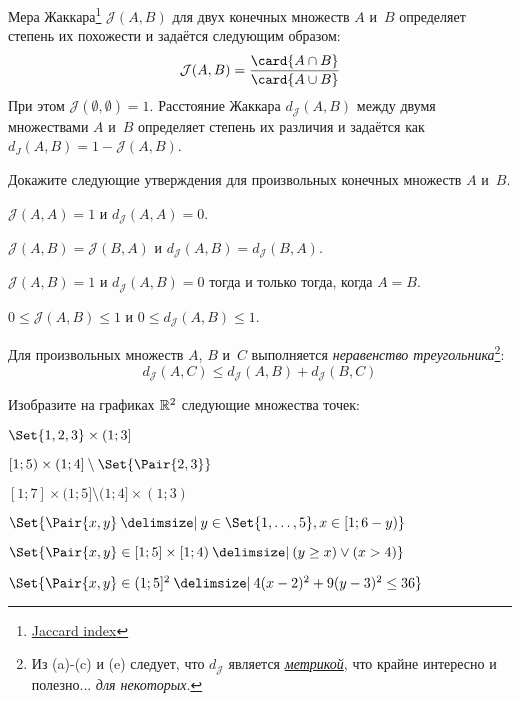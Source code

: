 \documentclass[a4paper,12pt]{article}
\newcommand{\Jaccard}{\mathcal{J}}
\newcommand{\JaccardDist}{d_{\Jaccard}}
\begin{document}
\begin{tasks}
    \item Мера Жаккара\footnote{\href{https://en.wikipedia.org/wiki/Jaccard_index}{Jaccard index}} $\Jaccard(A, B)$ для двух конечных множеств $A$ и~$B$ определяет степень их похожести и задаётся следующим образом:
    \[
        \Jaccard(A, B) = \frac{\card{A \intersection B}}{\card{A \union B}}
    \]
    При этом $\Jaccard(\emptyset, \emptyset) = 1$.
    Расстояние Жаккара $\JaccardDist(A,B)$ между двумя множествами $A$ и~$B$ определяет степень их различия и задаётся как $d_J(A,B) = 1 - \Jaccard(A,B)$.

    Докажите следующие утверждения для произвольных конечных множеств $A$ и~$B$.

    \begin{subtasks}
        \item $\Jaccard(A,A) = 1$ и $\JaccardDist(A,A) = 0$.
        \item $\Jaccard(A,B) = \Jaccard(B, A)$ и $\JaccardDist(A,B) = \JaccardDist(B, A)$.
        \item $\Jaccard(A,B) = 1$ и $\JaccardDist(A,B) = 0$ тогда и только тогда, когда $A = B$.
        \item $0 \leq \Jaccard(A,B) \leq 1$ и $0 \leq \JaccardDist(A,B) \leq 1$.
        \item Для произвольных множеств $A$, $B$ и~$C$ выполняется \emph{неравенство треугольника}\footnote{Из (a)-(c) и (e) следует, что $\JaccardDist$ является \href{https://en.wikipedia.org/wiki/Metric_space}{\emph{метрикой}}, что крайне интересно и полезно... \textit{для некоторых}.}:
        \[
            \JaccardDist(A,C) \leq \JaccardDist(A,B) + \JaccardDist(B,C)
        \]
    \end{subtasks}


    \item Изобразите на графиках $\mathbb{R}^2$ следующие множества точек:

    \begin{multicols}{2}
    \begin{subtasks}
        \item $\Set{1,2,3} \times (1; 3]$
        \item $[1; 5) \times (1; 4] \setminus \Set{\Pair{2, 3}}$
        \item $[1; 7] \times (1;5] \setminus (1;4] \times (1;3)$
        \item $\Set{\Pair{x,y} \given y \in \Set{1,\dots,5}, x \in [1; 6-y)}$
        \item $\Set{\Pair{x, y} \in [1; 5] \times [1; 4) \given (y \geq x) \lor (x > 4)}$
        \item $\Set{\Pair{x, y} \in (1;5]^2 \given 4(x-2)^2 + 9(y-3)^2 \leq 36}$
    \end{subtasks}
    \end{multicols}



\end{tasks}
\end{document}
